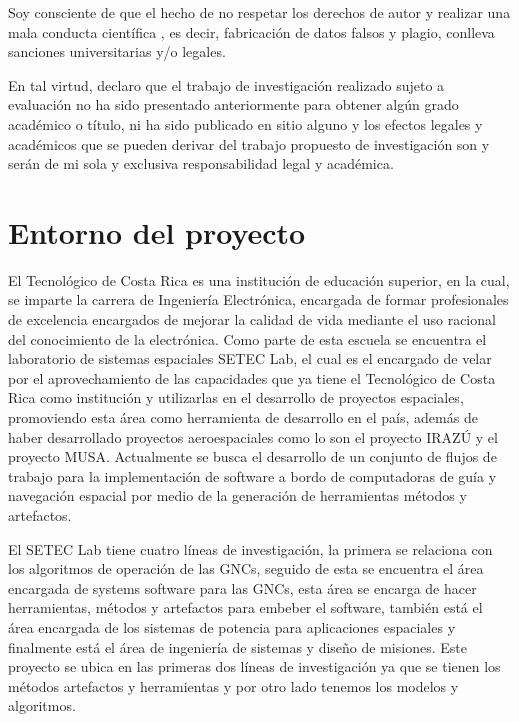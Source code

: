 \documentclass[12pt]{article}
\begin{document}
Soy consciente de que el hecho de no respetar los derechos de autor y realizar una mala conducta científica , es decir, fabricación de datos falsos y plagio, conlleva sanciones universitarias y/o legales.

En tal virtud, declaro que el trabajo de investigación realizado sujeto a evaluación no ha sido presentado anteriormente para obtener algún grado académico o título, ni ha sido publicado en sitio alguno y los efectos legales y académicos que se pueden derivar del trabajo propuesto de investigación son y serán de mi sola y exclusiva responsabilidad legal y académica.

\newpage
\tableofcontents

\newpage

\section{Entorno del proyecto}

El Tecnológico de Costa Rica es una institución de educación superior, en la cual, se imparte la carrera de Ingeniería Electrónica, encargada de formar profesionales de excelencia encargados de mejorar la calidad de vida mediante el uso racional del conocimiento de la electrónica. Como parte de esta escuela se encuentra el laboratorio de sistemas espaciales  SETEC Lab, el cual es el encargado de velar por el aprovechamiento de las capacidades que ya tiene el Tecnológico de Costa Rica como institución y utilizarlas en el desarrollo de proyectos espaciales, promoviendo esta área como herramienta de desarrollo en el país, además de haber desarrollado proyectos aeroespaciales como lo son el proyecto IRAZÚ y el proyecto MUSA. Actualmente se busca el desarrollo de un conjunto de flujos de trabajo para la implementación de software a bordo de computadoras de guía y navegación espacial por medio de la generación de herramientas métodos y artefactos. 

El SETEC Lab tiene cuatro líneas de investigación, la primera se relaciona con los algoritmos de operación de las GNCs, seguido de esta se encuentra el área encargada de systems software para las GNCs, esta área se encarga de hacer herramientas, métodos y artefactos para embeber el software, también está el área encargada de los sistemas de potencia para aplicaciones espaciales y finalmente está el área de ingeniería de sistemas y diseño de misiones. Este proyecto se ubica en las primeras dos líneas de investigación ya que se tienen los métodos artefactos y herramientas y por otro lado tenemos los modelos y algoritmos.
\end{document}
